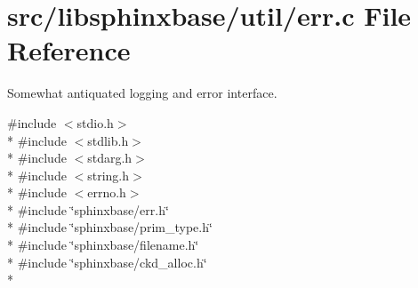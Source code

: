 \section{src/libsphinxbase/util/err.c File Reference}
\label{err_8c}


Somewhat antiquated logging and error interface.  


{\ttfamily \#include $<$stdio.\+h$>$}\\*
{\ttfamily \#include $<$stdlib.\+h$>$}\\*
{\ttfamily \#include $<$stdarg.\+h$>$}\\*
{\ttfamily \#include $<$string.\+h$>$}\\*
{\ttfamily \#include $<$errno.\+h$>$}\\*
{\ttfamily \#include \char`\"{}sphinxbase/err.\+h\char`\"{}}\\*
{\ttfamily \#include \char`\"{}sphinxbase/prim\+\_\+type.\+h\char`\"{}}\\*
{\ttfamily \#include \char`\"{}sphinxbase/filename.\+h\char`\"{}}\\*
{\ttfamily \#include \char`\"{}sphinxbase/ckd\+\_\+alloc.\+h\char`\"{}}\\*
